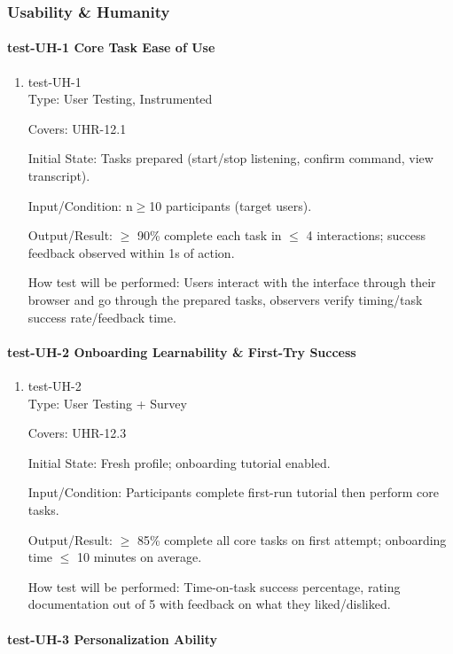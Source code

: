 \documentclass[12pt, titlepage]{article}
\begin{document}
\subsubsection{Usability \& Humanity}

\paragraph{test-UH-1 Core Task Ease of Use}

\begin{enumerate}
\item{test-UH-1\\}
Type: User Testing, Instrumented

Covers: UHR-12.1

Initial State: Tasks prepared (start/stop listening, confirm command, view transcript).

Input/Condition: n$\geq$10 participants (target users).

Output/Result: $\geq$ 90\% complete each task in $\leq$ 4 interactions; success feedback observed within 1s of action.

How test will be performed: Users interact with the interface through their browser and go through the prepared tasks, observers verify timing/task success rate/feedback time.
\end{enumerate}

\paragraph{test-UH-2 Onboarding Learnability \& First-Try Success}

\begin{enumerate}
\item{test-UH-2\\}
Type: User Testing + Survey

Covers: UHR-12.3

Initial State: Fresh profile; onboarding tutorial enabled.

Input/Condition: Participants complete first-run tutorial then perform core tasks.

Output/Result: $\geq$ 85\% complete all core tasks on first attempt; onboarding time $\leq$ 10 minutes on average.

How test will be performed: Time-on-task success percentage, rating documentation out of 5 with feedback on what they liked/disliked.
\end{enumerate}

\paragraph{test-UH-3 Personalization Ability}
\end{document}
